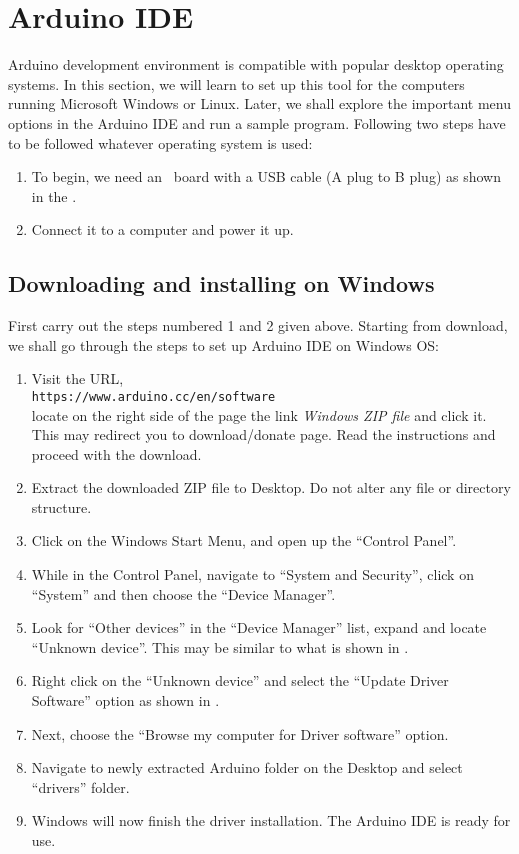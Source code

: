 \section{Arduino IDE}\label{arduino-ide}
\label{sec:ard-start}
Arduino development environment is compatible with popular desktop
operating systems. In this section, we will learn to set up this tool
for the computers running Microsoft Windows or Linux. Later, we shall
explore the important menu options in the Arduino IDE and run a sample
program.  Following two steps have to be followed whatever operating
system is used:

\begin{enumerate}
      \item To begin, we need an \arduino\ board with a USB cable (A plug to
            B plug) as shown in the .
      \item Connect it to a computer and power it up.
\end{enumerate}

\subsection{Downloading and installing on Windows}
First carry out the steps numbered 1 and 2 given above.
Starting from download, we shall go through the steps to set up
Arduino IDE on Windows OS:

\begin{enumerate}
      \setcounter{enumi}2
      \item Visit the URL, \\{\tt https://www.arduino.cc/en/software} \\
            locate on the right side of the page the link \emph{Windows ZIP file} and click it.  
            This may redirect you to download/donate page. Read the instructions and proceed with the
            download.
      \item Extract the downloaded ZIP file to Desktop. Do not alter any
            file or directory structure.
      \item Click on the Windows Start Menu, and open up the ``Control
            Panel''.
      \item While in the Control Panel, navigate to ``System and Security'',
            click on ``System'' and then choose the ``Device Manager''.
      \item Look for ``Other devices'' in the ``Device Manager'' list,
            expand and locate ``Unknown device''.  This may be similar to what
            is shown in .
      \item Right click on the ``Unknown device'' and select the ``Update
            Driver Software'' option as shown in .
      \item Next, choose the ``Browse my computer for Driver software''
            option.
      \item Navigate to newly extracted Arduino folder on the Desktop and
            select ``drivers'' folder.
      \item Windows will now finish the driver installation. The Arduino IDE
            is ready for use.
\end{enumerate}

